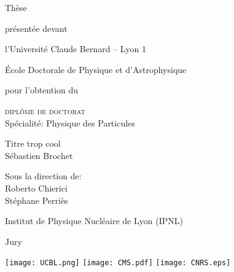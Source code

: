 \begin{titlepage}

\begin{center}
{\Large Thèse\\}

\vspace{1em}

{\small présentée devant\\}

\vspace{1em}

{\Large l'Université Claude Bernard -- Lyon 1\\

\vspace{0.2em}

École Doctorale de Physique et d'Astrophysique\\}

\vspace{2.5em}

pour l'obtention du \\

\vspace{2em}

{\Large \textsc{diplôme de doctorat}\\
\small Spécialité: Physique des Particules}

\end{center}

\vspace{3em}

\begin{center} \huge
Titre trop cool\\
\vspace{0.8em}
\Large Sébastien Brochet
\end{center}

\vspace{1.2em}

\begin{center}
\large
Sous la direction de:\\
Roberto Chierici\\
Stéphane Perriès
\end{center}

\begin{center}
\Large Institut de Physique Nucléaire de Lyon (IPNL)
\end{center}

\vspace{2em}

\begin{center}
Jury
\end{center}

\vfill

\begin{center}
\texttt{[image: UCBL.png]} \hspace{1cm}  \hspace{1cm} \texttt{[image: CMS.pdf]} \hspace{1cm} \texttt{[image: CNRS.eps]}
\end{center}

\end{titlepage}
